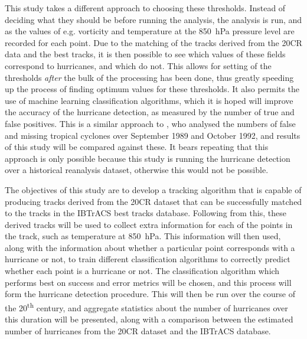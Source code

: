 \documentclass[pdftex,12pt,a4paper]{report}
\newcommand{\ts}{\textsuperscript}
\begin{document}
This study takes a different approach to choosing these thresholds. Instead of deciding what they
should be before running the analysis, the analysis is run, and as the values of e.g. vorticity and
temperature at the \SI{850}{hPa} pressure level are recorded for each point. Due to the matching of
the tracks derived from the 20CR data and the best tracks, it is then possible to see which values
of these fields correspond to hurricanes, and which do not. This allows for setting of the
thresholds \textit{after} the bulk of the processing has been done, thus greatly speeding up the
process of finding optimum values for these thresholds. It also permits the use of machine learning
classification algorithms, which it is hoped will improve the accuracy of the hurricane detection,
as measured by the number of true and false positives. This is a similar approach to
\textcite{walsh1995}, who analysed the numbers of false and missing tropical cyclones over September
1989 and October 1992, and results of this study will be compared against these. It bears repeating
that this approach is only possible because this study is running the hurricane detection over a
historical reanalysis dataset, otherwise this would not be possible.

The objectives of this study are to develop a tracking algorithm that is capable of producing tracks
derived from the 20CR dataset that can be successfully matched to the tracks in the IBTrACS best
tracks database. Following from this, these derived tracks will be used to collect extra information for
each of the points in the track, such as temperature at \SI{850}{hPa}. This information will then
used, along with the information about whether a particular point corresponds with a hurricane or
not, to train different classification algorithms to correctly predict whether each point is a
hurricane or not. The classification algorithm which performs best on success and error metrics will
be chosen, and this process will form the hurricane detection procedure. This will then be run
over the course of the 20\ts{th} century, and aggregate statistics about the number of hurricanes
over this duration will be presented, along with a comparison between the estimated number of
hurricanes from the 20CR dataset and the IBTrACS database.
\end{document}
